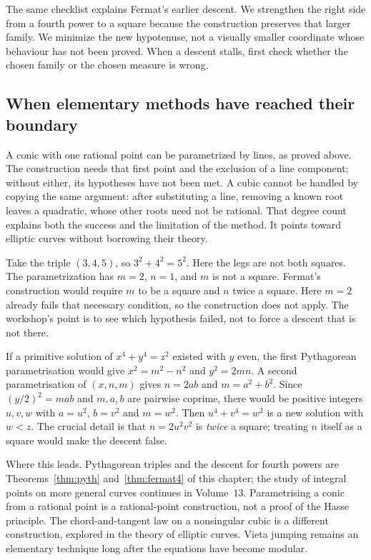 The same checklist explains Fermat's earlier descent. We strengthen the
right side from a fourth power to a square because the construction preserves
that larger family. We minimize the new hypotenuse, not a visually smaller
coordinate whose behaviour has not been proved. When a descent stalls,
first check whether the chosen family or the chosen measure is wrong.

\subsection*{When elementary methods have reached their boundary}
A conic with one rational point can be parametrized by lines, as proved
above. The construction needs that first point and the exclusion of a line
component; without either, its hypotheses have not been met. A cubic cannot
be handled by copying the same argument: after substituting a line, removing
a known root leaves a quadratic, whose other roots need not be rational.
That degree count explains both the success and the limitation of the method.
It points toward elliptic curves without borrowing their theory.

\begin{examplex}
Take the triple $(3,4,5)$, so $3^2+4^2=5^2$. Here the legs are not both squares. The parametrization has $m=2$, $n=1$, and $m$ is not a square. Fermat's construction would require $m$ to be a square and $n$ twice a square. Here $m=2$ already fails that necessary condition, so the construction does not apply. The workshop's point is to see which hypothesis failed, not to force a descent that is not there.
\end{examplex}

\begin{examplex}
If a primitive solution of $x^4+y^4=z^2$ existed with $y$ even, the first Pythagorean parametrisation would give $x^2=m^2-n^2$ and $y^2=2mn$. A second parametrisation of $(x,n,m)$ gives $n=2ab$ and $m=a^2+b^2$. Since $(y/2)^2=mab$ and $m,a,b$ are pairwise coprime, there would be positive integers $u,v,w$ with $a=u^2$, $b=v^2$ and $m=w^2$. Then $u^4+v^4=w^2$ is a new solution with $w<z$. The crucial detail is that $n=2u^2v^2$ is \emph{twice} a square; treating $n$ itself as a square would make the descent false.
\end{examplex}

\begin{beauty}
Where this leads. Pythagorean triples and the descent for fourth powers are Theorems~\ref{thm:pyth} and~\ref{thm:fermat4} of this chapter; the study of integral points on more general curves continues in Volume~13. Parametrising a conic from a rational point is a rational-point construction, not a proof of the Hasse principle. The chord-and-tangent law on a nonsingular cubic is a different construction, explored in the theory of elliptic curves. Vieta jumping remains an elementary technique long after the equations have become modular.
\end{beauty}

